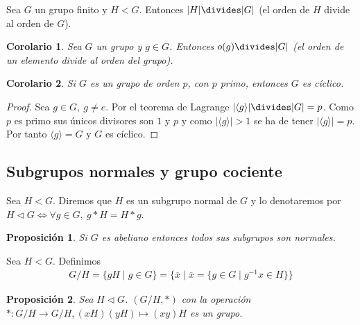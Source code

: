 \documentclass{book}
\newtheorem*{cor}{Corolario}
\newtheorem{pro}{Proposición}
\theoremstyle{definition}
\theoremstyle{remark}
\newcommand{\normsub}{\mathbin{\triangleleft}}
\newcommand{\inv}[1]{#1^{-1}}
\begin{document}


\begin{thm}[de Lagrange]
	\label{thm:lagrange}
	Sea $G$ un grupo finito y $H < G$. Entonces $|H| \divides |G| $ (el orden de $H$ divide al orden de $G$).
\end{thm}

\begin{cor}
	Sea $G$ un grupo y $g \in G$. Entonces $o(g) \divides |G|$ (el orden de un elemento divide al orden del grupo).
\end{cor}

\begin{cor}
	Si $G$ es un grupo de orden $p$, con $p$ primo, entonces $G$ es cíclico.
\end{cor}

\begin{proof}
	Sea $g \in G,\ g \neq e$. Por el teorema de Lagrange $|\langle g \rangle| \divides |G| = p$. Como $p$ es primo sus únicos divisores son $1$ y $p$ y como $|\langle g \rangle| > 1$ se ha de tener $|\langle g \rangle| = p$. Por tanto $\langle g \rangle = G$ y $G$ es cíclico. 
\end{proof}

\subsection{Subgrupos normales y grupo cociente}


\begin{dfn}
	Sea $H < G$. Diremos que $H$ es un subgrupo normal de $G$ y lo denotaremos por $H \normsub G \iff \forall g \in G,\ g\ast H = H \ast g$.  
\end{dfn}

\begin{pro}
	Si $G$ es abeliano entonces todos sus subgrupos son normales.
\end{pro}


\begin{dfn}
	Sea $H < G$. Definimos
	\begin{align}
	G/H = \{gH \mid g \in G\} = \{\overline{x} \mid \overline{x} = \{g \in G \mid \inv{g}x \in H\}\}
	\end{align}
\end{dfn}

\begin{pro}
	Sea $H \normsub G$. $(G/H, \ast)$ con la operación $\ast: G/H \to G/H, (xH)(yH) \mapsto (xy)H$ es un grupo.
\end{pro}
\end{document}
